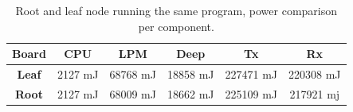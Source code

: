 \documentclass[conference]{IEEEtran}
\begin{document}
\begin{table}[H]
	\begin{center}
		\begin{tabular}{cccccc}
			\hline
			\textbf{Board}         & \textbf{CPU} & \textbf{LPM} & \textbf{Deep} & \textbf{Tx} & \textbf{Rx} \\ \hline
			\textbf{Leaf} & 2127 mJ      & 68768 mJ     & 18858 mJ      & 227471 mJ   & 220308 mJ   \\
			\textbf{Root} & 2127 mJ      & 68009 mJ     & 18662 mJ      & 225109 mJ   & 217921 mj   \\ \hline
		\end{tabular}
	\end{center}
	\caption{Root and leaf node running the same program, power comparison per component.}
	\label{tab:RXTXConsumptionComponent}
\end{table}
\end{document}
